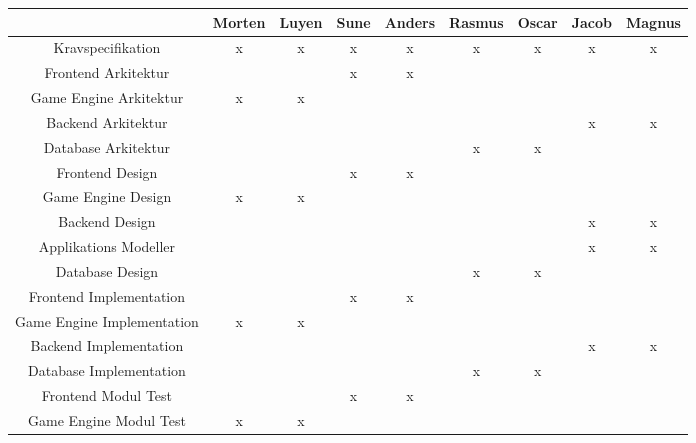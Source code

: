 \begin{center}
  \begin{longtable}{|c|c|c|c|c|c|c|c|c|}
    \hline
                                & Morten & Luyen & Sune  & Anders & Rasmus & Oscar & Jacob & Magnus \\ \hline
    Kravspecifikation           & x      & x     & x     & x      & x      & x     & x     & x      \\ \hline
    Frontend Arkitektur         &        &       & x     & x      &        &       &       &        \\ \hline
    Game Engine Arkitektur      & x      & x     &       &        &        &       &       &        \\ \hline
    Backend Arkitektur          &        &       &       &        &        &       & x     & x      \\ \hline
    Database Arkitektur         &        &       &       &        & x      & x     &       &        \\ \hline
    Frontend Design             &        &       & x     & x      &        &       &       &        \\ \hline
    Game Engine Design          & x      & x     &       &        &        &       &       &        \\ \hline
    Backend Design              &        &       &       &        &        &       & x     & x      \\ \hline
    Applikations Modeller       &        &       &       &        &        &       & x     & x      \\ \hline
    Database Design             &        &       &       &        & x      & x     &       &        \\ \hline
    Frontend Implementation     &        &       & x     & x      &        &       &       &        \\ \hline
    Game Engine Implementation  & x      & x     &       &        &        &       &       &        \\ \hline
    Backend Implementation      &        &       &       &        &        &       & x     & x      \\ \hline
    Database Implementation     &        &       &       &        & x      & x     &       &        \\ \hline
    Frontend Modul Test         &        &       & x     & x      &        &       &       &        \\ \hline
    Game Engine Modul Test      & x      & x     &       &        &        &       &       &        \\ \hline

\end{longtable}
\end{center}
